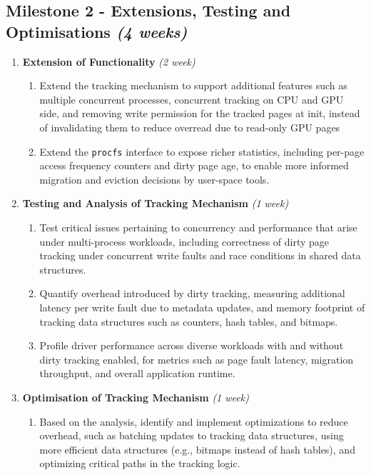 \subsection*{Milestone 2 - Extensions, Testing and Optimisations \hfill \textit{(4 weeks)}}
    \begin{enumerate}
        \item \textbf{Extension of Functionality} \hfill \textit{(2 week)}
        \begin{enumerate}
            \item Extend the tracking mechanism to support additional features such as multiple concurrent processes, concurrent tracking on
            CPU and GPU side, and removing write permission for the tracked pages at init, instead of invalidating them to reduce overread due to read-only GPU pages %
            \item Extend the \texttt{procfs} interface to expose richer statistics, including per-page access 
            frequency counters and dirty page age, to enable more informed migration and eviction decisions by user-space tools.
        \end{enumerate}
        \item \textbf{Testing and Analysis of Tracking Mechanism} \hfill \textit{(1 week)}
        \begin{enumerate}
            \item Test critical issues pertaining to concurrency and performance that arise under multi-process workloads, including correctness of dirty page tracking under concurrent write faults and race conditions in shared data structures.
            \item Quantify overhead introduced by dirty tracking, measuring additional latency per write fault due to metadata updates, and memory footprint of tracking data structures such as counters, hash tables, and bitmaps.
            \item Profile driver performance across diverse workloads with and without dirty tracking enabled, for metrics such as page fault latency, migration throughput, and overall application runtime.
        \end{enumerate}
        \item \textbf{Optimisation of Tracking Mechanism} \hfill \textit{(1 week)}
        \begin{enumerate}
            \item Based on the analysis, identify and implement optimizations to reduce overhead, such as batching updates to tracking data structures, using more efficient data structures (e.g., bitmaps instead of hash tables), and optimizing critical paths in the tracking logic.
        \end{enumerate}
    \end{enumerate}

